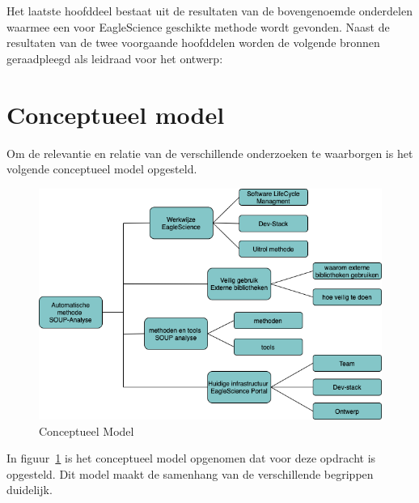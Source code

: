 Het laatste hoofddeel bestaat uit de resultaten van de bovengenoemde onderdelen waarmee een voor EagleScience geschikte methode wordt gevonden. Naast de resultaten van de twee voorgaande hoofddelen worden de volgende bronnen geraadpleegd als leidraad voor het ontwerp:

\section{Conceptueel model}\label{sec:conceptueel-model}
Om de relevantie en relatie van de verschillende onderzoeken te waarborgen is het volgende conceptueel model opgesteld.
\begin{figure}[H]
    \centering
    \includegraphics[width=12cm]{gfx/Conceptueel Model}
    \caption{Conceptueel Model}
    \label{fig:ConceptueelModel}
\end{figure}

In figuur~\ref{fig:ConceptueelModel} is het conceptueel model opgenomen dat voor deze opdracht is opgesteld. Dit model maakt de samenhang van de verschillende begrippen duidelijk.

